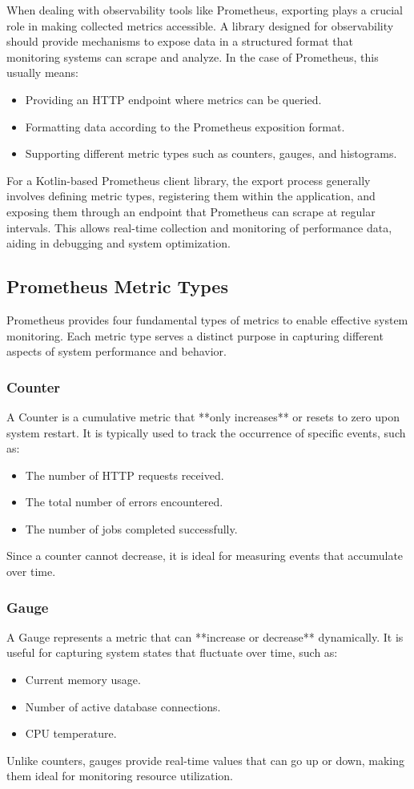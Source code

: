 \documentclass[a4paper,twoside,11pt]{article}
\begin{document}
When dealing with observability tools like Prometheus, exporting plays a crucial role in making collected metrics accessible. A library designed for observability should provide mechanisms to expose data in a structured format that monitoring systems can scrape and analyze. In the case of Prometheus, this usually means:
\begin{itemize}
    \item Providing an HTTP endpoint where metrics can be queried.
    \item Formatting data according to the Prometheus exposition format.
    \item Supporting different metric types such as counters, gauges, and histograms.
\end{itemize}

For a Kotlin-based Prometheus client library, the export process generally involves defining metric types, registering them within the application, and exposing them through an endpoint that Prometheus can scrape at regular intervals. This allows real-time collection and monitoring of performance data, aiding in debugging and system optimization.

\subsection{Prometheus Metric Types}
Prometheus provides four fundamental types of metrics to enable effective system monitoring. Each metric type serves a distinct purpose in capturing different aspects of system performance and behavior.

\subsubsection{Counter}
A Counter is a cumulative metric that **only increases** or resets to zero upon system restart. It is typically used to track the occurrence of specific events, such as:
\begin{itemize}
    \item The number of HTTP requests received.
    \item The total number of errors encountered.
    \item The number of jobs completed successfully.
\end{itemize}
Since a counter cannot decrease, it is ideal for measuring events that accumulate over time.

\subsubsection{Gauge}
A Gauge represents a metric that can **increase or decrease** dynamically. It is useful for capturing system states that fluctuate over time, such as:
\begin{itemize}
    \item Current memory usage.
    \item Number of active database connections.
    \item CPU temperature.
\end{itemize}
Unlike counters, gauges provide real-time values that can go up or down, making them ideal for monitoring resource utilization.
\end{document}
